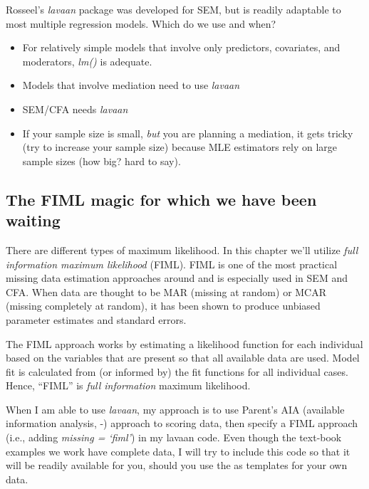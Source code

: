\documentclass[
  11pt,
]{book}
\providecommand{\tightlist}{%
  \setlength{\itemsep}{0pt}\setlength{\parskip}{0pt}}
\begin{document}
Rosseel's \citeyearpar{rosseel_lavaan_2020} \emph{lavaan} package was developed for SEM, but is readily adaptable to most multiple regression models. Which do we use and when?

\begin{itemize}
\tightlist
\item
  For relatively simple models that involve only predictors, covariates, and moderators, \emph{lm()} is adequate.
\item
  Models that involve mediation need to use \emph{lavaan}
\item
  SEM/CFA needs \emph{lavaan}
\item
  If your sample size is small, \emph{but} you are planning a mediation, it gets tricky (try to increase your sample size) because MLE estimators rely on large sample sizes (how big? hard to say).
\end{itemize}

\hypertarget{the-fiml-magic-for-which-we-have-been-waiting}{%
\subsection{The FIML magic for which we have been waiting}\label{the-fiml-magic-for-which-we-have-been-waiting}}

There are different types of maximum likelihood. In this chapter we'll utilize \emph{full information maximum likelihood} (FIML). FIML is one of the most practical missing data estimation approaches around and is especially used in SEM and CFA. When data are thought to be MAR (missing at random) or MCAR (missing completely at random), it has been shown to produce unbiased parameter estimates and standard errors.

The FIML approach works by estimating a likelihood function for each individual based on the variables that are present so that all available data are used. Model fit is calculated from (or informed by) the fit functions for all individual cases. Hence, ``FIML'' is \emph{full information} maximum likelihood.

When I am able to use \emph{lavaan}, my approach is to use Parent's AIA (available information analysis, -\citet{parent_handling_2013}) approach to scoring data, then specify a FIML approach (i.e., adding \emph{missing = `fiml'}) in my lavaan code. Even though the text-book examples we work have complete data, I will try to include this code so that it will be readily available for you, should you use the as templates for your own data.
\end{document}
